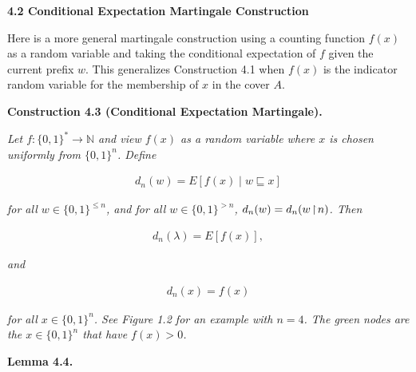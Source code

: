 \par\medskip\noindent\textbf{
4.2 Conditional Expectation Martingale Construction}\par




Here is a more general martingale construction using a counting function $f(x)$ as a random variable and taking the conditional expectation of $f$ given the current prefix $w$. This generalizes Construction 4.1 when $f(x)$ is the indicator random variable for the membership of $x$ in the cover $A$.\par





\par\medskip\noindent\textbf{
\textbf{Construction 4.3}\textbf{ }(Conditional Expectation Martingale)\textbf{.}
}\par



\emph{Let $f:\{0,1\}^{*}\to\mathbb{N}$
and view $f(x)$ as a random variable where $x$ is chosen uniformly from $\{0,1\}^{n}$. Define}\par


\[\begin{gathered}
d_{n}(w)=E[f(x)\mid w\sqsubseteq x]
\end{gathered}\]


\emph{for all $w\in\{0,1\}^{\leq n}$, and for all $w\in\{0,1\}^{>n}$, $d_{n}(w)=d_{n}(w\negthinspace\upharpoonright\negthinspace n)$.
Then}\par


\[\begin{gathered}
d_{n}(\lambda)=E[f(x)],
\end{gathered}\]


\emph{and}\par


\[\begin{gathered}
d_{n}(x)=f(x)
\end{gathered}\]


\emph{for all $x\in\{0,1\}^{n}$.
See Figure 1.2 for an example with $n=4$. The green nodes are the $x\in\{0,1\}^{n}$ that have $f(x)>0$.}\par







\par\medskip\noindent\textbf{
\textbf{Lemma 4.4}\textbf{.}
}\par



